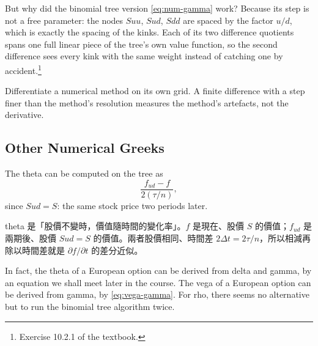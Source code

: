 But why did the binomial tree version \eqref{eq:num-gamma} work?
\suppstart
Because its step is not a free parameter: the nodes $Suu$, $Sud$, $Sdd$ are spaced by the factor $u/d$, which is exactly the spacing of the kinks.
Each of its two difference quotients spans one full linear piece of the tree's own value function, so the second difference sees every kink with the same weight instead of catching one by accident.\footnote{Exercise 10.2.1 of the textbook.}


\begin{moral}
	Differentiate a numerical method on its own grid.
	A finite difference with a step finer than the method's resolution measures the method's artefacts, not the derivative.
\end{moral}

\suppend

\subsection{Other Numerical Greeks}


The theta can be computed on the tree as
\[
	\frac{f_{ud}-f}{2(\tau/n)} ,
\]
\suppstart
since $Sud=S$: the same stock price two periods later.

\begin{remark}
	theta 是「股價不變時，價值隨時間的變化率」。$f$ 是現在、股價 $S$ 的價值；$f_{ud}$ 是兩期後、股價 $Sud=S$ 的價值。兩者股價相同、時間差 $2\Delta t=2\tau/n$，所以相減再除以時間差就是 $\partial f/\partial t$ 的差分近似。
\end{remark}
\suppend
In fact, the theta of a European option can be derived from delta and gamma, by an equation we shall meet later in the course.
The vega of a European option can be derived from gamma, by \eqref{eq:vega-gamma}.
For rho, there seems no alternative but to run the binomial tree algorithm twice.

\suppstart
{}
\suppend

